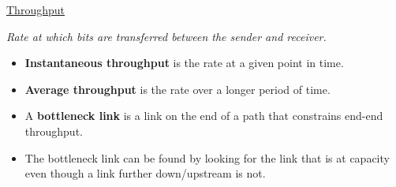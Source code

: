 \documentclass{article}
\begin{document}
\underline{Throughput}\\
\vspace{-4mm}

{\it Rate at which bits are transferred between the sender and receiver.}

\begin{itemize}
\item {\bf Instantaneous throughput} is the rate at a given point in time.
\item {\bf Average throughput} is the rate over a longer period of time.
\item A {\bf bottleneck link} is a link on the end of a path that constrains end-end throughput.
\item The bottleneck link can be found by looking for the link that is at capacity even though a link further down/upstream is not.
\end{itemize}
\end{document}
